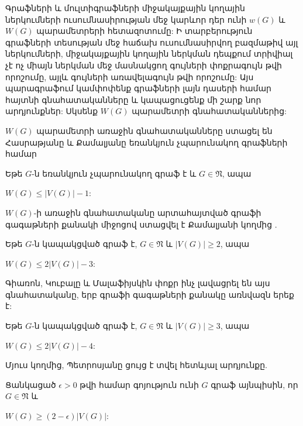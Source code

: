 Գրաֆների և մուլտիգրաֆների միջակայքային կողային ներկումների ուսումնասիրության մեջ կարևոր դեր ունի $w(G)$ և $W(G)$ պարամետրերի հետազոտումը: Ի տարբերություն գրաֆների տեսության մեջ հաճախ ուսումնասիրվող բազմաթիվ այլ ներկումների, միջակայքային կողային ներկման դեպքում տրիվիալ չէ ոչ միայն ներկման մեջ մասնակցող գույների փոքրագույն թվի որոշումը, այլև գույների առավելագույն թվի որոշումը: Այս պարագրաֆում կամփոփենք գրաֆների լայն դասերի համար հայտնի գնահատականները և կապացուցենք մի շարք նոր արդյունքներ: Սկսենք $W(G)$ պարամետրի գնահատականներից:

$W(G)$ պարամետրի առաջին գնահատականները ստացել են Հասրաթյանը և Քամալյանը եռանկյուն չպարունակող գրաֆների համար \cite{AsratianKamalian1987,AsratianKamalian1994,Kamalian1990}
\begin{theorem}
\label{t1_upper_notriangle} Եթե $G$-ն եռանկյուն չպարունակող գրաֆ է և $G\in \mathfrak{N}$, ապա 
\begin{center}
$W(G)\leq \vert V(G)\vert -1$:
\end{center}
\end{theorem}

$W(G)$-ի առաջին գնահատականը արտահայտված գրաֆի գագաթների քանակի միջոցով ստացվել է Քամալյանի կողմից \cite{Kamalian1990}.

\begin{theorem}
\label{t1_upper_2V-3}
Եթե $G$-ն կապակցված գրաֆ է, $G\in \mathfrak{N}$ և $|V(G)|\geq 2$, ապա
\begin{center}
$W(G)\leq 2|V(G)|-3$:
\end{center}
\end{theorem}

Գիառոն, Կուբալը և Մալաֆիյսկին \cite{GiaroKubaleMalafiejski2001} փոքր ինչ լավացրել են այս  գնահատականը, երբ գրաֆի գագաթների քանակը առնվազն երեք է:
\begin{theorem}
\label{t1_upper_2V-4}
Եթե $G$-ն կապակցված գրաֆ է, $G\in \mathfrak{N}$ և $|V(G)|\geq 3$, ապա
\begin{center}
$W(G)\leq 2|V(G)|-4$:
\end{center}
\end{theorem}

Մյուս կողմից, Պետրոսյանը \cite{Petrosyan2010} ցույց է տվել հետևյալ արդյունքը. 
\begin{theorem}
Ցանկացած $\epsilon > 0$ թվի համար գոյություն ունի $G$ գրաֆ այնպիսին, որ $G \in \mathfrak{N}$ և
\begin{center}
$W(G) \geq (2-\epsilon)|V(G)|$:
\end{center}
\end{theorem}

